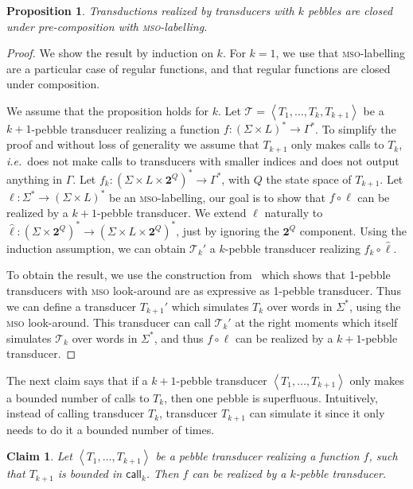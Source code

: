 \documentclass[sigplan,review,anonymous]{acmart}\settopmatter{printfolios=true,printccs=false,printacmref=false}
\newcommand{\atuple}[1]{\left\langle #1 \right\rangle}
\newcommand{\Tt}{\mathcal T}
\newcommand{\mso}{\textsc{mso}\xspace}
\newcommand{\call}{\mathsf {call}}
\newtheorem{proposition}[theorem]{Proposition}
\newtheorem{claim}[theorem]{Claim}
\theoremstyle{definition}
\theoremstyle{remark}
\begin{document}
\begin{proposition}
  \label{prop:precomp}
  Transductions realized by transducers with $k$ pebbles are closed under pre-composition with \mso-labelling.
\end{proposition}

\begin{proof}
  We show the result by induction on $k$.
For $k=1$, we use that \mso-labelling are a particular case of regular functions, and that regular functions are closed under composition.

We assume that the proposition holds for $k$.
Let $\Tt=\atuple{T_1,\ldots,T_k,T_{k+1}}$ be a $k+1$-pebble transducer realizing a function $f:(\Sigma\times L)^*\rightarrow \Gamma^*$.
To simplify the proof and without loss of generality we assume that $T_{k+1}$ only makes calls to $T_k$, \textit{i.e.}~does not make calls to transducers with smaller indices and does not output anything in $\Gamma$.
Let $f_k:(\Sigma\times L\times\mathbf 2^Q)^*\rightarrow \Gamma^*$, with $Q$ the state space of $T_{k+1}$.
Let $\ell:\Sigma^*\rightarrow(\Sigma\times L)^*$ be an \mso-labelling, our goal is to show that $f\circ \ell$ can be realized by a $k+1$-pebble transducer.
We extend $\ell$ naturally to $\hat \ell:(\Sigma\times\mathbf 2^{Q})^*\rightarrow(\Sigma\times L\times\mathbf 2^{Q})^*$, just by ignoring the $\mathbf 2^{Q}$ component.
Using the induction assumption, we can obtain $\Tt_k'$ a $k$-pebble transducer realizing $f_k\circ \hat \ell$.

To obtain the result, we use the construction from~\cite[Lemma 6]{EngelfrietH01} which shows that 1-pebble transducers with \mso look-around are as expressive as 1-pebble transducer. Thus we can define a transducer $T_{k+1}'$ which simulates $T_k$ over words in $\Sigma^*$, using the \mso look-around. This transducer can call $\Tt_k'$ at the right moments which itself simulates $\Tt_k$ over words in $\Sigma^*$, and thus $f\circ \ell$ can be realized by a $k+1$-pebble transducer.
\end{proof}

The next claim says that if a $k+1$-pebble transducer $\atuple{T_1,\ldots,T_{k+1}}$ only makes a bounded number of calls to $T_k$, then one pebble is superfluous. Intuitively, instead of calling transducer $T_k$, transducer $T_{k+1}$ can simulate it since it only needs to do it a bounded number of times.
\begin{claim} 
    \label{claim:bounded}
    Let $\atuple{T_1,\ldots,T_{k+1}}$ be a pebble transducer realizing a function $f$, such that $T_{k+1}$ is bounded in $\call_k$. Then $f$ can be realized by a $k$-pebble transducer.
\end{claim}
\end{document}
